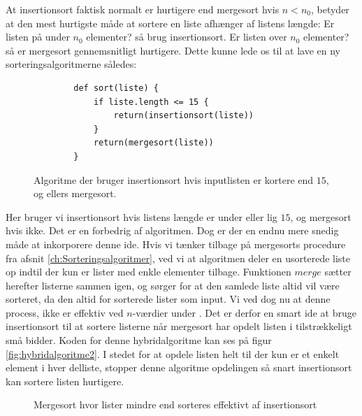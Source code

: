 At insertionsort faktisk normalt er hurtigere end mergesort hvis $n < n_0$, betyder at den mest hurtigste måde at sortere en liste afhænger af listens længde: Er listen på under $n_0$ elementer? så brug insertionsort. Er listen over $n_0$ elementer? så er mergesort gennemsnitligt hurtigere. Dette kunne lede os til at lave en ny sorteringsalgoritmerne således:

\begin{figure}[h]
	\begin{center}
		\begin{lstlisting}
		def sort(liste) {
			if liste.length <= 15 {
				return(insertionsort(liste))
			}
			return(mergesort(liste))
		}
		\end{lstlisting}
	\end{center}
	\vspace{-6mm}
	\caption{Algoritme der bruger insertionsort hvis inputlisten er kortere end $15$, og ellers mergesort.}
	\label{fig:hybridalgoritme1}
\end{figure}


Her bruger vi insertionsort hvis listens længde er under eller lig $15$, og mergesort hvis ikke. Det er en forbedrig af algoritmen. Dog er der en endnu mere snedig måde at inkorporere denne ide. Hvis vi tænker tilbage på mergesorts procedure fra afsnit \ref{ch:Sorteringsalgoritmer}, ved vi at algoritmen deler en usorterede liste op indtil der kun er lister med enkle elementer tilbage. Funktionen $merge$ sætter herefter listerne sammen igen, og sørger for at den samlede liste altid vil være sorteret, da den altid for sorterede lister som input. Vi ved dog nu at denne process, ikke er effektiv ved $n$-værdier under . Det er derfor en smart ide at bruge insertionsort til at sortere listerne når mergesort har opdelt listen i tilstrækkeligt små bidder. Koden for denne hybridalgoritme kan ses på figur \ref{fig:hybridalgoritme2}. I stedet for at opdele listen helt til der kun er et enkelt element i hver delliste, stopper denne algoritme opdelingen så snart insertionsort kan sortere listen hurtigere.


\begin{figure}
	\begin{center}
		
	\end{center}
	\caption{Mergesort hvor lister mindre end  sorteres effektivt af insertionsort}
	\label{fig:hybridalgoritme}
\end{figure}







